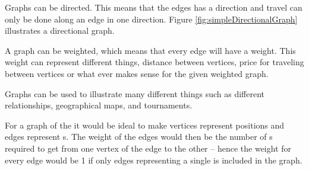 Graphs can be directed. This means that the edges has a direction and travel can only be done along an edge in one direction. Figure \ref{fig:simpleDirectionalGraph} illustrates a directional graph. 

A graph can be weighted, which means that every edge will have a weight.
This weight can represent different things, distance between vertices, price for traveling between vertices or what ever makes sense for the given weighted graph.

\begin{figure}[htb]
	\centering
		\hspace{0.2\textwidth}
		\hspace{0.2\textwidth}
		\caption{}
		\label{fig:cross}
\end{figure}

Graphs can be used to illustrate many different things such as different relationships, geographical maps, and tournaments.\cite[pp. 592-593]{Rosen07} 

For a graph of the \rubik{} it would be ideal to make vertices represent positions and edges represent \twist{}s. The weight of the edges would then be the number of \twist{}s required to get from one vertex of the edge to the other -- hence the weight for every edge would be 1 if only edges representing a single \twist{} is included in the graph.

